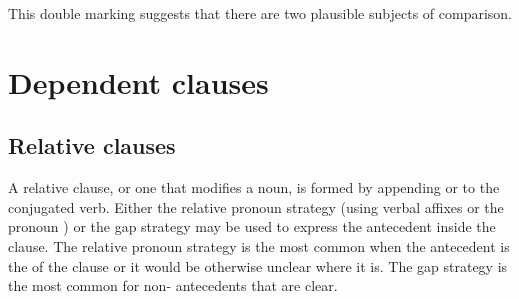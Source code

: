\documentclass{book}
\begin{document}
This double marking suggests that there are two plausible subjects of comparison.

\section{Dependent clauses}

\subsection{Relative clauses}

A relative clause, or one that modifies a noun, is formed by appending  or  to the conjugated verb. Either the relative pronoun strategy (using verbal affixes or the pronoun ) or the gap strategy may be used to express the antecedent inside the clause. The relative pronoun strategy is the most common when the antecedent is the  of the clause or it would be otherwise unclear where it is. The gap strategy is the most common for non- antecedents that are clear.
\end{document}
